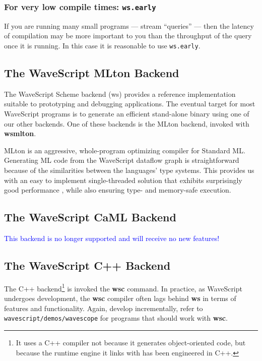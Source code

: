 \documentclass[twocolumn]{report}
\newcommand{\rednote}[1]{{\textcolor{blue}{#1}}}
\newcommand{\ws}{WaveScript}
\begin{document}
\subsubsection*{For very low compile times: {\tt \bf ws.early}}

If you are running many small programs --- stream ``queries'' --- then
the latency of compilation may be more important to you than the
throughput of the query once it is running.  In this case it is
reasonable to use {\tt ws.early}.




\subsection{The WaveScript MLton Backend}

The WaveScript Scheme backend (ws) provides a reference implementation suitable
to prototyping and debugging applications.  The eventual target for
most WaveScript programs is to generate an efficient stand-alone
binary using one of our other backends.  One of these backends is the
MLton backend, invoked with {\bf wsmlton}.

MLton is an aggressive, whole-program optimizing compiler for Standard
ML.  Generating ML code from the {\ws} dataflow graph is
straightforward because of the similarities between the languages'
type systems.  This provides us with an easy to implement
single-threaded solution that exhibits surprisingly good performance
\cite{mlton}, while also ensuring type- and memory-safe
execution.  

\subsection{The WaveScript CaML Backend}

\rednote{This backend is no longer supported and will receive no new features!}

\subsection{The WaveScript C++ Backend}
The C++ backend\footnote{It uses a C++ compiler not because it
  generates object-oriented code, but because the runtime engine it
  links with has been engineered in C++.} is invoked the {\bf wsc}
command.  
In practice, as WaveScript undergoes development, the {\bf wsc}
compiler often lags behind {\bf ws} in terms of features and
functionality.  Again, develop incrementally, refer to {\tt
  wavescript/demos/wavescope} for programs that should work with {\bf
  wsc}.
\end{document}
